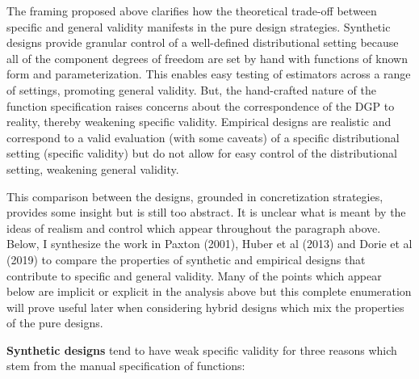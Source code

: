 \documentclass[../main.tex]{subfiles}
\begin{document}
\vspace{\baselineskip}
The framing proposed above clarifies how the theoretical trade-off between specific and general validity manifests in the pure design strategies. Synthetic designs provide granular control of a well-defined distributional setting because all of the component degrees of freedom are set by hand with functions of known form and parameterization. This enables easy testing of estimators across a range of settings, promoting general validity. But, the hand-crafted nature of the function specification raises concerns about the correspondence of the DGP to reality, thereby weakening specific validity. Empirical designs are realistic and correspond to a valid evaluation (with some caveats) of a specific distributional setting (specific validity) but do not allow for easy control of the distributional setting, weakening general validity.\par


\vspace{\baselineskip}
This comparison between the designs, grounded in concretization strategies, provides some insight but is still too abstract. It is unclear what is meant by the ideas of realism and control which appear throughout the paragraph above. Below, I synthesize the work in Paxton (2001), Huber et al (2013) and Dorie et al (2019) to compare the properties of synthetic and empirical designs that contribute to specific and general validity. Many of the points which appear below are implicit or explicit in the analysis above but this complete enumeration will prove useful later when considering hybrid designs which mix the properties of the pure designs.\par


\vspace{\baselineskip}
\textbf{Synthetic designs} tend to have weak specific validity for three reasons which stem from the manual specification of functions:\par
\end{document}
